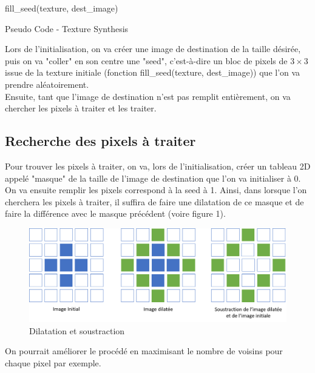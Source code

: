 \begin{algorithm}[H]
 fill\_seed(texture, dest\_image)\;
 \caption{Pseudo Code - Texture Synthesis}
\end{algorithm}

\medbreak
Lors de l'initialisation, on va créer une image de destination de la taille désirée, puis on va "coller" en son centre une "seed", c'est-à-dire un bloc de pixels de $3\times3$ issue de la texture initiale (fonction fill\_seed(texture, dest\_image)) que l'on va prendre aléatoirement. \\

Ensuite, tant que l'image de destination n'est pas remplit entièrement, on va chercher les pixels à traiter et les traiter. 

\subsection{Recherche des pixels à traiter}
Pour trouver les pixels à traiter, on va, lors de l'initialisation, créer un tableau 2D appelé "masque" de la taille de l'image de destination que l'on va initialiser à 0. On va ensuite remplir les pixels correspond à la seed à 1.
Ainsi, dans lorsque l'on cherchera les pixels à traiter, il suffira de faire une dilatation de ce masque et de faire la différence avec le masque précédent (voire figure 1).

\begin{figure}[!h]
\centering
\includegraphics[scale=0.25]{dilatation_soustraction.png}
\caption{Dilatation et soustraction}
\end{figure}

On pourrait améliorer le procédé en maximisant le nombre de voisins pour chaque pixel par exemple.

